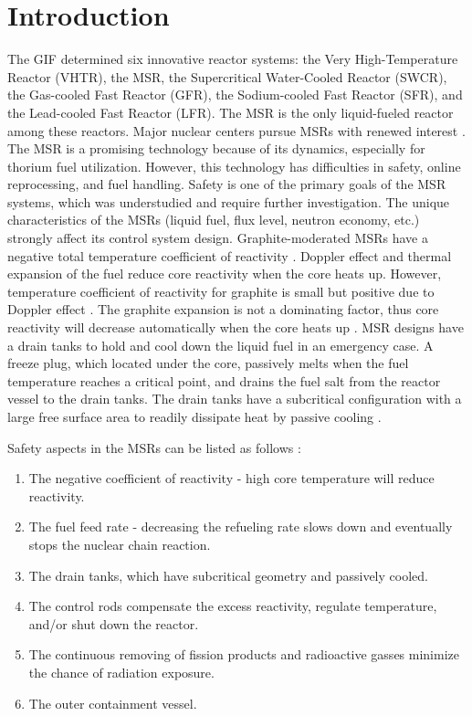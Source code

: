 \section{Introduction} \label{Introduction}

The \gls{GIF} \cite{doe2002technology} determined six innovative reactor 
systems: the Very High-Temperature Reactor (VHTR), the \gls{MSR}, the 
Supercritical Water-Cooled Reactor (SWCR), the Gas-cooled Fast Reactor (GFR), 
the Sodium-cooled Fast Reactor (SFR), and the Lead-cooled Fast Reactor (LFR). 
The MSR is the only liquid-fueled reactor among these reactors. Major nuclear 
centers pursue MSRs with renewed interest \cite{betzler_impacts_2019, 
ashraf2019whole_core,betzler2016modeling,mohsin2019safety,zhang2020radiotoxicity}.
 The MSR is a promising technology because of its dynamics, especially for 
thorium fuel utilization. However, this technology has difficulties in safety, 
online reprocessing, and fuel handling. Safety is one of the primary goals of 
the MSR systems, which was understudied and require further investigation. The 
unique characteristics of the MSRs (liquid fuel, flux level, neutron economy, 
etc.) strongly affect its control system design. Graphite-moderated MSRs have 
a negative total temperature coefficient of reactivity 
\cite{robertson_conceptual_1971,nuttin2005potential,rykhlevskii2019modeling,ashraf2019whole_core}.
 Doppler effect and thermal expansion of the fuel reduce core reactivity when 
the core heats up. However, temperature coefficient of reactivity for graphite 
is small but positive due to Doppler effect \cite{mathieu2006thorium, 
rykhlevskii_full-core_2017}. The graphite expansion is not a 
dominating factor, thus core reactivity will decrease automatically when the 
core heats up \cite{li_optimization_2018}. MSR designs have a drain tanks to 
hold and cool down the liquid fuel in an emergency case. A freeze plug, which 
located under the core, passively melts when the fuel temperature reaches a 
critical point, and drains the fuel salt from the reactor vessel to the drain 
tanks. The drain tanks have a subcritical
configuration with a large free 
surface area to readily dissipate heat by passive cooling 
\cite{elsheikh2013safety}.

Safety aspects in the MSRs can be listed as follows 
\cite{elsheikh2013safety,merle2008optimization}:
\begin{enumerate}
\item The negative coefficient of reactivity - high core temperature will reduce reactivity.
\item The fuel feed rate - decreasing the refueling rate slows down and eventually stops the nuclear chain reaction.
\item The drain tanks, which have subcritical geometry and passively cooled.
\item The control rods compensate the excess reactivity, regulate temperature, and/or shut down the reactor.
\item The continuous removing of fission products and radioactive gasses minimize the chance of radiation exposure.
\item The outer containment vessel.
\end{enumerate}

